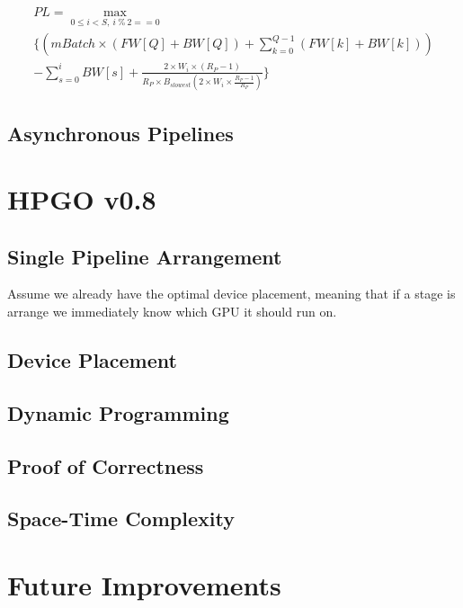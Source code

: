 \documentclass[11pt]{article}
\begin{document}
\begin{gather}
    PL=\max_{0 \le i < S,\ i\ \%\ 2 == 0} \\\{
    (mBatch \times (FW[Q] + BW[Q]) + \sum_{k=0}^{Q-1}{(FW[k] + BW[k])}) \\- \sum_{s=0}^i BW[s] + \frac{2 \times W_i \times (R_P-1)}{R_P \times B_{slowest}(2 \times W_i \times \frac{R_P-1}{R_P})} \}
\end{gather}

\subsection{Asynchronous Pipelines}
\label{sec:org3cae795}

\section{HPGO v0.8}
\label{sec:orgb81ed4f}
\subsection{Single Pipeline Arrangement}
\label{sec:org507c172}
Assume we already have the optimal device placement, meaning that if a stage is arrange we immediately know which GPU it should run on. 
\subsection{Device Placement}
\label{sec:org30a40d8}

\subsection{Dynamic Programming}
\label{sec:org21a40c0}
\subsection{Proof of Correctness}
\label{sec:org97bc479}
\subsection{Space-Time Complexity}
\label{sec:orgfee4535}

\section{Future Improvements}
\label{sec:orgecc4373}
\end{document}

